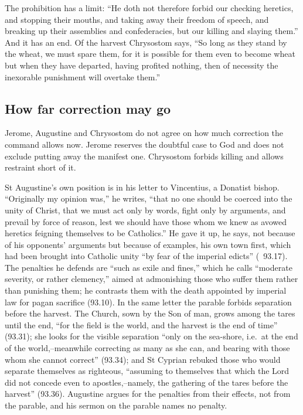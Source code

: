 The prohibition has a limit: ``He doth not therefore forbid our checking
heretics, and stopping their mouths, and taking away their freedom of speech,
and breaking up their assemblies and confederacies, but our killing and
slaying them.'' And it has an end. Of the harvest Chrysostom says, ``So long as
they stand by the wheat, we must spare them, for it is possible for them even
to become wheat but when they have departed, having profited nothing, then of
necessity the inexorable punishment will overtake them.''

\subsection{How far correction may go}
\label{sec:patience-discipline}

Jerome, Augustine and Chrysostom do not agree on how much correction the
command allows now. Jerome reserves the doubtful case to God and does not
exclude putting away the manifest one. Chrysostom forbids killing and allows
restraint short of it.

St Augustine's own position is in his letter to Vincentius, a Donatist
bishop. ``Originally my opinion was,'' he writes, ``that no one should be
coerced into the unity of Christ, that we must act only by words, fight only
by arguments, and prevail by force of reason, lest we should have those whom
we knew as avowed heretics feigning themselves to be Catholics.'' He gave it
up, he says, not because of his opponents' arguments but because of examples,
his own town first, which had been brought into Catholic unity ``by fear of the
imperial edicts'' (~93.17). The penalties he defends are ``such as
exile and fines,'' which he calls ``moderate severity, or rather clemency,''
aimed at admonishing those who suffer them rather than punishing them; he
contrasts them with the death appointed by imperial law for pagan sacrifice
(93.10). In the same letter the parable forbids separation before the harvest.
The Church, sown by the Son of man, grows among the tares until the end, ``for
the field is the world, and the harvest is the end of time'' (93.31); she
looks for the visible separation ``only on the sea-shore, i.e.\ at the end of
the world,--meanwhile correcting as many as she can, and bearing with those
whom she cannot correct'' (93.34); and St Cyprian rebuked those who would
separate themselves as righteous, ``assuming to themselves that which the
Lord did not concede even to apostles,--namely, the gathering of the tares
before the harvest'' (93.36). Augustine argues for the penalties from their
effects, not from the parable, and his sermon on the parable names no
penalty.

